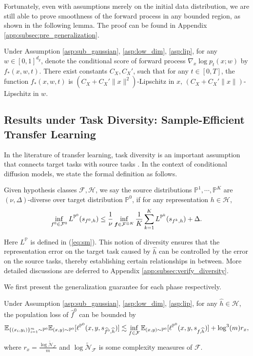 \documentclass[11pt]{article}
\numberwithin{equation}{section}
\renewcommand{\P}{\mathbb{P}}
\renewcommand{\eqref}[1]{(\ref{#1})}
\begin{document}
Fortunately, even with assumptions merely on the initial data distribution, we are still able to prove smoothness of the forward process in any bounded region, as shown in the following lemma. The proof can be found in Appendix \ref{app:subsec:pre_generalization}.
\begin{lemma}\label{lem:lip_score_informal}
    Under Assumption \ref{asp:sub_gaussian}, \ref{asp:low_dim}, \ref{asp:lip}, for any $w\in[0,1]^{d_y}$, denote the conditional score of forward process $\nabla_x\log p_t(x;w)$ by $f_*(x,w,t)$.
    There exist constants $C_X,C_X'$, such that for any $t\in[0,T]$, the function $f_*(x,w,t)$ is $(C_X+C_X'\|x\|^2)$-Lipschitz in $x$, $(C_X+C_X'\|x\|)$-Lipschitz in $w$.
\end{lemma}

\subsection{Results under Task Diversity: Sample-Efficient Transfer Learning}

In the literature of transfer learning, task diversity is an important assumption that connects target tasks with source tasks \citep{tripuraneni2020theory,du2020few,chua2021fine}.
In the context of conditional diffusion models, we state the formal definition as follows.
\begin{definition}\label{def:diversity}
    Given hypothesis classes $\mathcal{F},\mathcal{H}$, we say the source distributions $\P^1,\cdots,\P^K$ are $(\nu,\Delta)$-diverse over target distribution $\P^{0}$, if for any representation $h\in\mathcal{H}$,
    \begin{equation}
        \inf_{f^0\in\mathcal{F}^0}L^{\P^0}(s_{f^0,h})\leq \frac{1}{\nu}\inf_{\vf\in\mathcal{F}^{\otimes K}}\frac{1}{K}\sum_{k=1}^K L^{\P^k}(s_{f^{k},h}) + \Delta.
    \end{equation}
\end{definition}
Here $L^\P$ is defined in \eqref{eq:sm}.
This notion of diversity ensures that the representation error on the target task caused by $\widehat{h}$ can be controlled by the error on the source tasks, thereby establishing certain relationships in between.
More detailed discussions are deferred to Appendix \ref{app:subsec:verify_diversity}.

We first present the generalization guarantee for each phase respectively.
\begin{prop}\label{prop:generalization_test_informal}
    Under Assumption \ref{asp:sub_gaussian}, \ref{asp:low_dim}, \ref{asp:lip}, for any $\widehat{h}\in\mathcal{H}$, the population loss of $\widehat{f}^0$ can be bounded by
    \begin{equation}
        \E_{\{(x_i,y_i)\}_{i=1}^m\sim \P^0} \E_{(x,y)\sim\P^0} [\ell^{\P^0}(x,y,s_{\widehat{f}^0,\widehat{h}})]\lesssim \inf_{f\in\mathcal{F}}\E_{(x,y)\sim\P^0}[\ell^{\P^0}(x,y,s_{f,\widehat{h}})] + \log^3(m) r_x,
    \end{equation}
    where $r_x=\frac{\log\widetilde{\mathcal{N}}_\mathcal{F}}{m}$ and $\log\widetilde{\mathcal{N}}_\mathcal{F}$ is some complexity measures of $\mathcal{F}$.
\end{prop}
\end{document}
